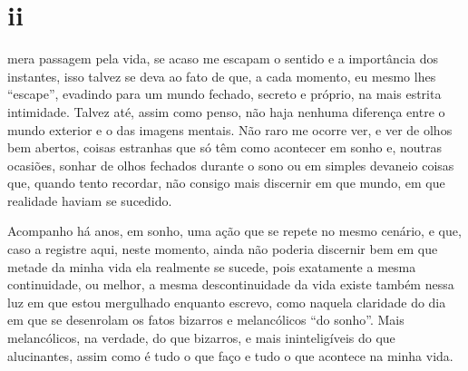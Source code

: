 \section{ii}

 mera passagem pela vida, se acaso me escapam o sentido e a
importância dos instantes, isso talvez se deva ao fato de que, a cada
momento, eu mesmo lhes ``escape'', evadindo para um mundo fechado,
secreto e próprio, na mais estrita intimidade. Talvez até, assim como
penso, não haja nenhuma diferença entre o mundo exterior e o das imagens
mentais. Não raro me ocorre ver, e ver de olhos bem abertos, coisas
estranhas que só têm como acontecer em sonho e, noutras ocasiões, sonhar
de olhos fechados durante o sono ou em simples devaneio coisas que,
quando tento recordar, não consigo mais discernir em que mundo, em que
realidade haviam se sucedido.



Acompanho há anos, em sonho, uma ação que se repete no mesmo cenário, e
que, caso a registre aqui, neste momento, ainda não poderia discernir
bem em que metade da minha vida ela realmente se sucede, pois exatamente
a mesma continuidade, ou melhor, a mesma descontinuidade da vida existe
também nessa luz em que estou mergulhado enquanto escrevo, como naquela
claridade do dia em que se desenrolam os fatos bizarros e melancólicos
``do sonho''. Mais melancólicos, na verdade, do que bizarros, e mais
ininteligíveis do que alucinantes, assim como é tudo o que faço e tudo o
que acontece na minha vida.

